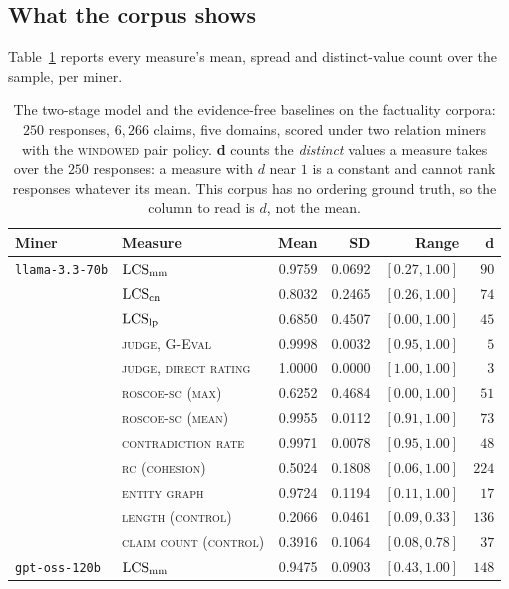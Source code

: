 \subsection{What the corpus shows}
\label{sec-fc-results}

Table~\ref{tab:factuality-coherence} reports every measure's mean, spread and distinct-value
count over the sample, per miner.

\begin{table}[t]
\centering\small
\caption{The two-stage model and the evidence-free baselines on the factuality corpora:
  $250$ responses, $6{,}266$ claims, five domains, scored under two relation miners with the
  \textsc{windowed} pair policy. \textbf{d} counts the \emph{distinct} values a measure takes
  over the $250$ responses: a measure with $d$ near $1$ is a constant and cannot rank
  responses whatever its mean. This corpus has no ordering ground truth, so the column to read
  is $d$, not the mean.}
\label{tab:factuality-coherence}
\begin{tabular}{@{}llrrrr@{}}
\toprule
Miner & Measure & Mean & SD & Range & d \\
\midrule
\texttt{llama-3.3-70b} & $\mathrm{LCS}_{\mathrm{mm}}$ & 0.9759 & 0.0692 & $[0.27, 1.00]$ & $90$ \\
 & $\mathrm{LCS}_{\mathrm{cn}}$ & 0.8032 & 0.2465 & $[0.26, 1.00]$ & $74$ \\
 & $\mathrm{LCS}_{\mathrm{lp}}$ & 0.6850 & 0.4507 & $[0.00, 1.00]$ & $45$ \\
 & \textsc{judge, G-Eval} & 0.9998 & 0.0032 & $[0.95, 1.00]$ & $5$ \\
 & \textsc{judge, direct rating} & 1.0000 & 0.0000 & $[1.00, 1.00]$ & $3$ \\
 & \textsc{roscoe-sc (max)} & 0.6252 & 0.4684 & $[0.00, 1.00]$ & $51$ \\
 & \textsc{roscoe-sc (mean)} & 0.9955 & 0.0112 & $[0.91, 1.00]$ & $73$ \\
 & \textsc{contradiction rate} & 0.9971 & 0.0078 & $[0.95, 1.00]$ & $48$ \\
 & \textsc{rc (cohesion)} & 0.5024 & 0.1808 & $[0.06, 1.00]$ & $224$ \\
 & \textsc{entity graph} & 0.9724 & 0.1194 & $[0.11, 1.00]$ & $17$ \\
 & \textsc{length (control)} & 0.2066 & 0.0461 & $[0.09, 0.33]$ & $136$ \\
 & \textsc{claim count (control)} & 0.3916 & 0.1064 & $[0.08, 0.78]$ & $37$ \\
\midrule
\texttt{gpt-oss-120b} & $\mathrm{LCS}_{\mathrm{mm}}$ & 0.9475 & 0.0903 & $[0.43, 1.00]$ & $148$ \\

\end{tabular}
\end{table}
